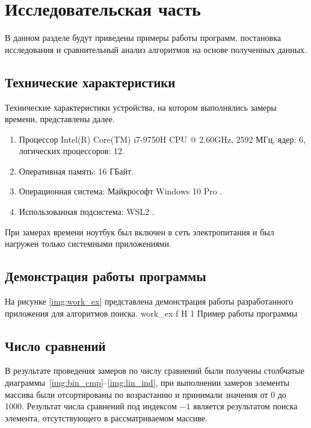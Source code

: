 \chapter{Исследовательская часть}

В данном разделе будут приведены примеры работы программ, постановка исследования и сравнительный анализ алгоритмов на основе полученных данных.


\section{Технические характеристики}

Технические характеристики устройства, на котором выполнялись замеры времени, представлены далее.

\begin{enumerate}
	\item Процессор	Intel(R) Core(TM) i7-9750H CPU @ 2.60GHz, 2592 МГц, ядер: 6, логических процессоров: 12.
	\item Оперативная память: 16 ГБайт.
	\item Операционная система: Майкрософт Windows 10 Pro \cite{windows}.
	\item Использованная подсистема: WSL2 \cite{WSL2}.
\end{enumerate}

При замерах времени ноутбук был включен в сеть электропитания и был нагружен только системными приложениями.



\section{Демонстрация работы программы}

На рисунке \ref{img:work_ex} представлена демонстрация работы разработанного приложения для алгоритмов поиска.
{work_ex} %
{f} %
{H} %
{1\textwidth} %
{Пример работы программы} %



\section{Число сравнений}

В результате проведения замеров по числу сравнений были получены столбчатые диаграммы~\ref{img:bin_cmp}--\ref{img:lin_ind}, при выполнении замеров элементы массива были отсортированы по возрастанию и принимали значения от 0 до 1000. Результат числа сравнений под индексом $-1$ является результатом поиска элемента, отсутствующего в рассматриваемом массиве.

